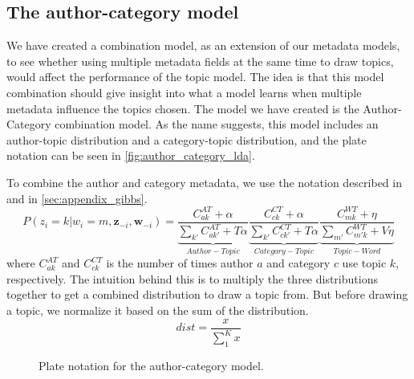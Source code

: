 \subsection{The author-category model}\label{sec:combination}
We have created a combination model, as an extension of our metadata models, to see whether using multiple metadata fields at the same time to draw topics, would affect the performance of the topic model.
The idea is that this model combination should give insight into what a model learns when multiple metadata influence the topics chosen.
The model we have created is the Author-Category combination model.
As the name suggests, this model includes an author-topic distribution and a category-topic distribution, and the plate notation can be seen in \autoref{fig:author_category_lda}.

To combine the author and category metadata, we use the notation described in \citet{author_topic_2012} and in \autoref{sec:appendix_gibbs}.
\begin{equation}
		P(z_i = k |w_i = m, \boldsymbol{z}_{-i}, \boldsymbol{w}_{-i}) = 
	\underbrace{\frac{C^{AT}_{ak} + \alpha}{\sum_{k'} C^{AT}_{ak'} + T\alpha}}_{Author-Topic}
	\underbrace{\frac{C^{CT}_{ck} + \alpha}{\sum_{k'} C^{CT}_{ck'} + T\alpha}}_{Category-Topic}
	\underbrace{\frac{C^{WT}_{mk} + \eta}{\sum_{m'} C^{WT}_{m'k} + V\eta}}_{Topic-Word}
\end{equation}
where $C^{AT}_{ak}$ and $C^{CT}_{ck}$ is the number of times author $a$ and category $c$ use topic $k$, respectively.
The intuition behind this is to multiply the three distributions together to get a combined distribution to draw a topic from.
But before drawing a topic, we normalize it based on the sum of the distribution.
\begin{equation}
	dist = \frac{x}{\sum_{1}^{K} x}
\end{equation}

\begin{figure*}[ht]
	\centering
	\resizebox{.3\textwidth}{!}{%
		
	}
	\caption{Plate notation for the author-category model.}
	\label{fig:author_category_lda}
\end{figure*}




